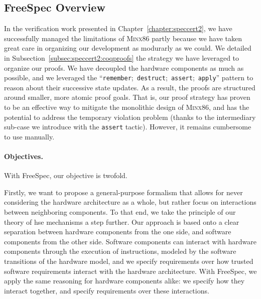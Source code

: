\subsection{FreeSpec Overview}
\label{freespec:subsec:freespecoverview}

In the verification work presented in Chapter~\ref{chapter:speccert2}, we have
successfully managed the limitations of {\scshape Minx86} partly because we have
taken great care in organizing our development as modurarly as we could.
%
We detailed in Subsection~\ref{subsec:speccert2:coqproofs} the strategy we have
leveraged to organize our proofs.
%
We have decoupled the hardware components as much as possible, and we leveraged
the ``\texttt{remember};~\texttt{destruct};~\texttt{assert};~\texttt{apply}''
pattern to reason about their successive state updates.
%
As a result, the proofs are structured around smaller, more atomic proof goals.
%
That is, our proof strategy has proven to be an effective way to mitigate the
monolithic design of {\scshape Minx86}, and has the potential to address the
temporary violation problem (thanks to the intermediary sub-case we introduce
with the \texttt{assert} tactic).
%
However, it remains cumbersome to use manually.

\paragraph{Objectives.}
%
With FreeSpec, our objective is twofold.

Firstly, we want to propose a general-purpose formalism that allows for never
considering the hardware architecture as a whole, but rather focus on
interactions between neighboring components.
%
To that end, we take the principle of our theory of \ac{hse} mechanisms a step
further.
%
Our approach is based onto a clear separation between hardware components from
the one side, and software components from the other side.
%
Software components can interact with hardware components through the execution
of instructions, modeled by the software transitions of the hardware model, and
we specify requirements over how trusted software requirements interact with the
hardware architecture.
%
With FreeSpec, we apply the same reasoning for hardware components alike: we
specify how they interact together, and specify requirements over these
interactions.

